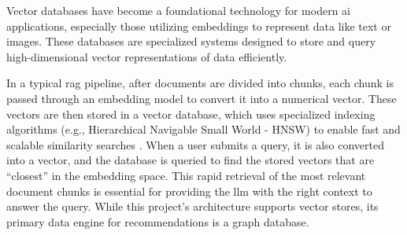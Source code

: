 Vector databases have become a foundational technology for modern \ac{ai} applications, especially those utilizing embeddings to represent data like text or images. These databases are specialized systems designed to store and query high-dimensional vector representations of data efficiently.

In a typical \ac{rag} pipeline, after documents are divided into chunks, each chunk is passed through an embedding model to convert it into a numerical vector. These vectors are then stored in a vector database, which uses specialized indexing algorithms (e.g., Hierarchical Navigable Small World - HNSW) to enable fast and scalable similarity searches \cite{SOTA-RAG-SURVEY}. When a user submits a query, it is also converted into a vector, and the database is queried to find the stored vectors that are ``closest'' in the embedding space. This rapid retrieval of the most relevant document chunks is essential for providing the \ac{llm} with the right context to answer the query. While this project's architecture supports vector stores, its primary data engine for recommendations is a graph database.
